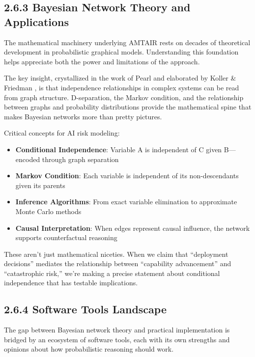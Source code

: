 \documentclass[
  11pt,
  letterpaper,
  openany]{book}
\providecommand{\tightlist}{%
  \setlength{\itemsep}{0pt}\setlength{\parskip}{0pt}}
\begin{document}
\subsection{2.6.3 Bayesian Network Theory and
Applications}\label{sec-bn-theory}

The mathematical machinery underlying AMTAIR rests on decades of
theoretical development in probabilistic graphical models. Understanding
this foundation helps appreciate both the power and limitations of the
approach.

The key insight, crystallized in the work of Pearl \textcite{pearl2014}
and elaborated by Koller \& Friedman \textcite{koller2009}, is that
independence relationships in complex systems can be read from graph
structure. D-separation, the Markov condition, and the relationship
between graphs and probability distributions provide the mathematical
spine that makes Bayesian networks more than pretty pictures.

Critical concepts for AI risk modeling:

\begin{itemize}
\tightlist
\item
  \textbf{Conditional Independence}: Variable A is independent of C
  given B---encoded through graph separation
\item
  \textbf{Markov Condition}: Each variable is independent of its
  non-descendants given its parents
\item
  \textbf{Inference Algorithms}: From exact variable elimination to
  approximate Monte Carlo methods
\item
  \textbf{Causal Interpretation}: When edges represent causal influence,
  the network supports counterfactual reasoning
\end{itemize}

These aren't just mathematical niceties. When we claim that ``deployment
decisions'' mediates the relationship between ``capability advancement''
and ``catastrophic risk,'' we're making a precise statement about
conditional independence that has testable implications.

\subsection{2.6.4 Software Tools Landscape}\label{sec-software-tools}

The gap between Bayesian network theory and practical implementation is
bridged by an ecosystem of software tools, each with its own strengths
and opinions about how probabilistic reasoning should work.
\end{document}
